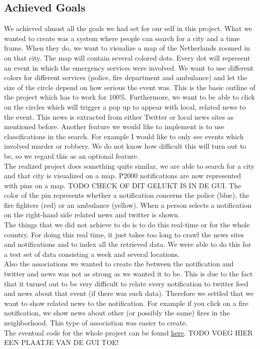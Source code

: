 \subsection*{Achieved Goals}
We achieved almost all the goals we had set for our self in this project. 
What we wanted to create was a system where people can search for a city and a time frame.
When they do, we want to visualize a map of the Netherlands zoomed in on that city. 
The map will contain several colored dots. 
Every dot will represent an event in which the emergency services were involved. 
We want to use different colors for different services (police, fire department and ambulance) and let the size of the circle depend on how serious the event was. This is the basic outline of the project which has to work for 100$\%$. Furthermore, we want to be able to click on the circles which will trigger a pop up to appear with local, related news to the event. This news is extracted from either Twitter or local news sites as mentioned before. Another feature we would like to implement is to use classifications in the search. For example I would like to only see events which involved murder or robbery. We do not know how difficult this will turn out to be, so we regard this as an optional feature.\\
The realized project does something quite similar, we are able to search for a city and that city is visualized on a map.
P2000 notifications are now represented with pins on a map. 
TODO CHECK OF DIT GELUKT IS IN DE GUI. The color of the pin represents whether a notification concerns the police (blue), the fire fighters (red) or an ambulance (yellow).
When a person selects a notification on the right-hand side related news and twitter is shown.\\
The things that we did not achieve to do is to do this real-time or for the whole country. 
For doing this real time, it just takes too long to crawl the news sites and notifications and to index all the retrieved data.
We were able to do this for a test set of data consisting a week and several locations.\\
Also the associations we wanted to create the between the notification and twitter and news was not as strong as we wanted it to be.
This is due to the fact that it turned out to be very difficult to relate every notification to twitter feed and news about that event (if there was such data).
Therefore we settled that we want to show related news to the notification.
For example if you click on a fire notification, we show news about other (or possibly the same) fires in the neighborhood.
This type of association was easier to create.\\
The eventual code for the whole project can be found \href{https://www.dropbox.com/home/Public/Code_2IMW15_Group_20}{here}.
TODO VOEG HIER EEN PLAATJE VAN DE GUI TOE!
